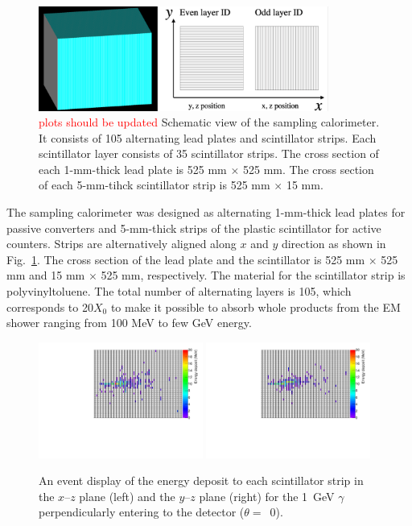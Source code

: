 \documentclass[jkps,preprint,fleqn,showpacs,showkeys]{revtex4}
\begin{document}
\begin{figure}[!hbt]
\includegraphics[width=0.85\textwidth]{figures/Sec2/Prototype_samplingcal.pdf}
\caption{ \textcolor{red}{plots should be updated} Schematic view of the sampling calorimeter. It consists of 105 alternating lead plates and scintillator strips. Each scintillator layer consists of 35 scintillator strips. The cross section of each 1-mm-thick lead plate is 525 mm $\times$ 525 mm. The cross section of each 5-mm-tihck scintillator strip is 525 mm $\times$ 15 mm. }
\label{fig:det_conf}
\end{figure}

The sampling calorimeter was designed as alternating 1-mm-thick lead plates for passive converters and 5-mm-thick strips of the plastic scintillator for active counters. Strips are alternatively aligned along $x$ and $y$ direction as shown in Fig.~\ref{fig:det_conf}. The cross section of the lead plate and the scintillator is 525 mm $\times$ 525 mm and 15 mm $\times$ 525 mm, respectively. The material for the scintillator strip is polyvinyltoluene. The total number of alternating layers is 105, which corresponds to 20$X_{0}$ to make it possible to absorb whole products from the EM shower ranging from 100 MeV to few GeV energy.

\begin{figure}[!hbt]
\includegraphics[width=0.48\textwidth]{figures/SingleEventXZHit.pdf}
\includegraphics[width=0.48\textwidth]{figures/SingleEventYZHit.pdf}
\caption{ An event display of the energy deposit to each scintillator strip in the $x$--$z$ plane (left) and the $y$--$z$ plane (right) for the 1~GeV $\gamma$ perpendicularly entering to the detector ($\theta=$~0).}
\label{fig:Evt_Dis}
\end{figure}
\end{document}
